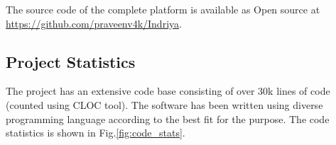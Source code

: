 The source code of the complete platform is available as Open source at \url{https://github.com/praveenv4k/Indriya}. 
\subsection{Project Statistics}
The project has an extensive code base consisting of over 30k lines of code (counted using CLOC tool). The software has been written using diverse programming language according to the best fit for the purpose. The code statistics is shown in Fig.\ref{fig:code_stats}.

